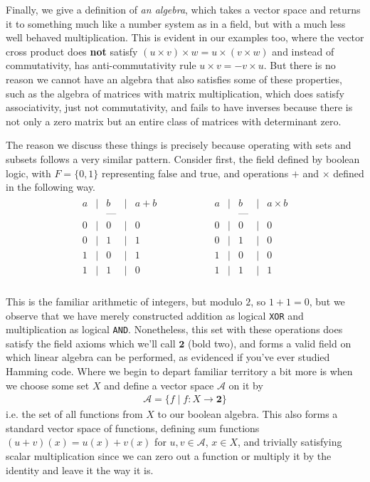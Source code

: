 \documentclass[11pt]{article}
\begin{document}
Finally, we give a definition of \emph{an algebra}, which takes a vector space and returns it to something much like a number system as in a field, but with a much less well behaved multiplication. This is evident in our examples too, where the vector cross product does \textbf{not} satisfy $(u \times v) \times w = u \times (v \times w)$ and instead of commutativity, has anti-commutativity rule $u \times v = - v \times u$. But there is no reason we cannot have an algebra that also satisfies some of these properties, such as the algebra of matrices with matrix multiplication, which does satisfy associativity, just not commutativity, and fails to have inverses because there is not only a zero matrix but an entire class of matrices with determinant zero.

The reason we discuss these things is precisely because operating with sets and subsets follows a very similar pattern. Consider first, the field defined by boolean logic, with $F = \{0,1\}$ representing false and true, and operations $+$ and $\times$ defined in the following way.\begin{gather*}
\begin{matrix}
a & | & b & | & a + b \\ &&\text{---}&& \\ 
0 & | & 0 & | & 0 \\
0 & | & 1 & | & 1 \\
1 & | & 0 & | & 1 \\
1 & | & 1 & | & 0 \\
\end{matrix} \hspace{5em} \begin{matrix}
a & | & b & | & a \times b \\ &&\text{---}&& \\ 
0 & | & 0 & | & 0 \\
0 & | & 1 & | & 0 \\
1 & | & 0 & | & 0 \\
1 & | & 1 & | & 1 \\
\end{matrix}
\end{gather*}

This is the familiar arithmetic of integers, but modulo $2$, so $1+1 = 0$, but we observe that we have merely constructed addition as logical \texttt{XOR} and multiplication as logical \texttt{AND}. Nonetheless, this set with these operations does satisfy the field axioms which we'll call $\mathbf{2}$ (bold two), and forms a valid field on which linear algebra can be performed, as evidenced if you've ever studied Hamming code. Where we begin to depart familiar territory a bit more is when we choose some set $X$ and define a vector space $\mathcal A$ on it by \begin{gather*}
\mathcal A = \{f \mid f \colon X \to \mathbf{2} \}
\end{gather*}
i.e. the set of all functions from $X$ to our boolean algebra. This also forms a standard vector space of functions, defining sum functions $(u+v)(x) = u(x) + v(x)$ for $u,v\in \mathcal A$, $x \in X$, and trivially satisfying scalar multiplication since we can zero out a function or multiply it by the identity and leave it the way it is.
\end{document}
